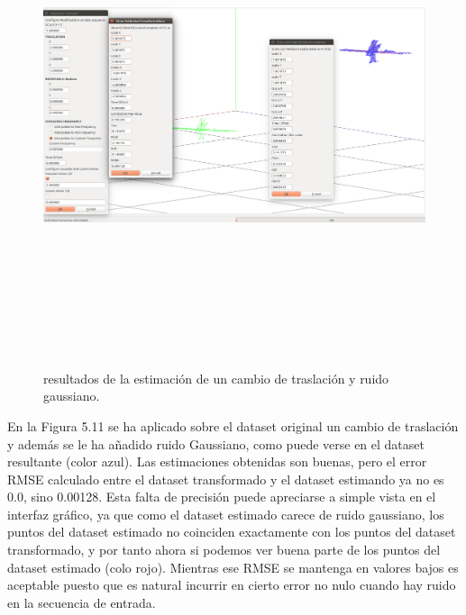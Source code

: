 \begin{figure}[H]
\begin{center}
\label{fig:opciones de View}\includegraphics[height=14.0cm,width=18.0cm]{img/cap6/Trasla_GaussNoise_abba.png}
\hspace{0.5cm}

\end{center}

\caption{ resultados de la estimación de un cambio de traslación y ruido gaussiano.}
\end{figure}
En la Figura 5.11 se ha aplicado sobre el dataset original un cambio de traslación y además se le ha añadido ruido Gaussiano, como puede verse en el dataset resultante (color azul). Las estimaciones obtenidas son buenas, pero el error RMSE calculado entre el dataset transformado y el dataset estimando ya no es 0.0, sino 0.00128. Esta falta de precisión puede apreciarse a simple vista en el interfaz gráfico, ya que como el dataset estimado carece de ruido gaussiano, los puntos del dataset estimado no coinciden exactamente con los puntos del dataset transformado, y por tanto ahora si podemos ver buena parte de los puntos del dataset estimado (colo rojo).
Mientras ese RMSE se mantenga en valores bajos es aceptable puesto que es natural incurrir en cierto error no nulo cuando hay ruido en la secuencia de entrada.

